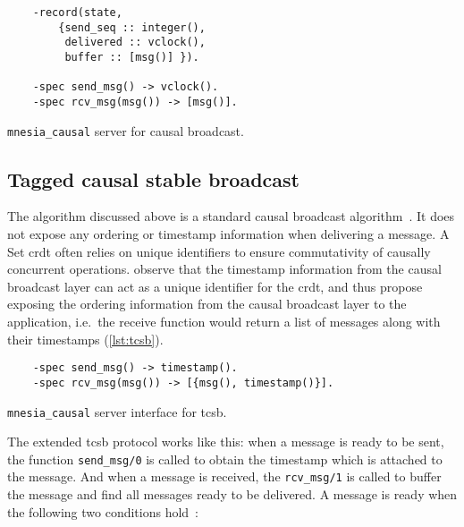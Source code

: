 \begin{listing}[htp]
  \centering
  \begin{verbatim}
    -record(state,
        {send_seq :: integer(),
         delivered :: vclock(),
         buffer :: [msg()] }).

    -spec send_msg() -> vclock().
    -spec rcv_msg(msg()) -> [msg()].
  \end{verbatim} 
  \caption{\texttt{mnesia\_causal} server for causal broadcast.}
  \label{lst:causal broadcast server}
\end{listing}


\subsection{Tagged causal stable broadcast} \label{subsec:impl tcsb}

The algorithm discussed above is a standard causal broadcast 
algorithm~\cite{schmuck1988broadcast,kleppmann2022dist-notes,birman1991causal}.
It does not expose any ordering or timestamp information when delivering a message.
A Set \acrshort{crdt} often relies on unique identifiers to
ensure commutativity of causally concurrent operations. \citet{baquero2017PureOp}
observe that the timestamp information from the causal broadcast layer can act
as a unique identifier for the \acrshort{crdt}, and thus
propose exposing the ordering information from the causal broadcast layer to
the application, i.e.\ the receive function would return a list of messages
along with their timestamps (\cref{lst:tcsb}).

\begin{listing}[htp]
  \centering
  \begin{verbatim}
    -spec send_msg() -> timestamp().
    -spec rcv_msg(msg()) -> [{msg(), timestamp()}].
  \end{verbatim} 
  \caption{\texttt{mnesia\_causal} server interface for \acrlong{tcsb}.}
  \label{lst:tcsb}
\end{listing}

The extended \acrfull{tcsb} protocol works like this: when a message is ready 
to be sent, the function \verb|send_msg/0| is called to obtain the timestamp which
is attached to the message. 
And when a message is received, the \verb|rcv_msg/1| is called to buffer the message
and find all messages ready to be delivered. A message is ready when
the following two conditions hold~\cite{schmuck1988broadcast,
kleppmann2022dist-notes,birman1991causal}:

